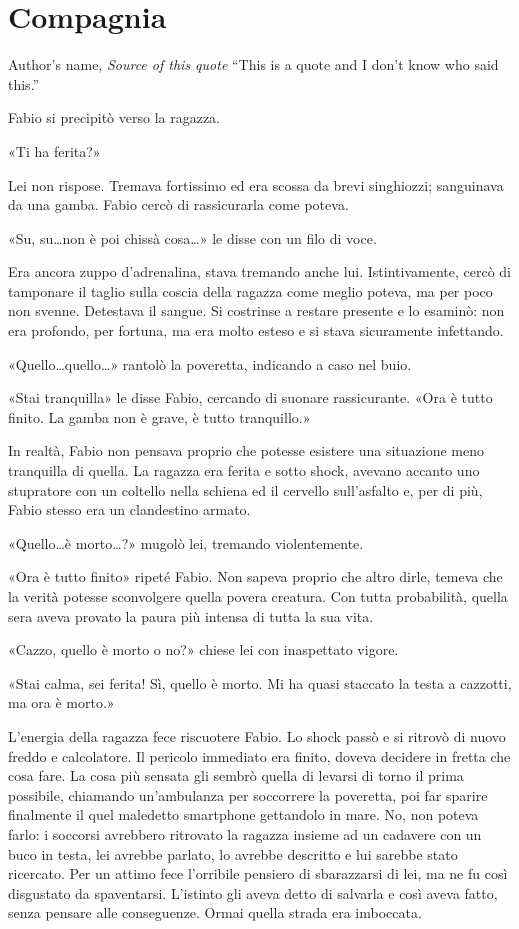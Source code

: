 \chapter{Compagnia}

\begin{chapquote}{Author's name, \textit{Source of this quote}}
``This is a quote and I don't know who said this.''
\end{chapquote}



Fabio si precipitò verso la ragazza.

«Ti ha ferita?»

Lei non rispose. Tremava fortissimo ed era scossa da brevi singhiozzi; sanguinava da una gamba. Fabio cercò di rassicurarla come poteva.

«Su, su\ldots non è poi chissà cosa\ldots» le disse con un filo di voce.

Era ancora zuppo d'adrenalina, stava tremando anche lui. Istintivamente, cercò di tamponare il taglio sulla coscia della ragazza come meglio poteva, ma per poco non svenne. Detestava il sangue. Si costrinse a restare presente e lo esaminò: non era profondo, per fortuna, ma era molto esteso e si stava sicuramente infettando.

«Quello\ldots quello\ldots» rantolò la poveretta, indicando a caso nel buio.

«Stai tranquilla» le disse Fabio, cercando di suonare rassicurante. «Ora è tutto finito. La gamba non è grave, è tutto tranquillo.»

In realtà, Fabio non pensava proprio che potesse esistere una situazione meno tranquilla di quella. La ragazza era ferita e sotto shock, avevano accanto uno stupratore con un coltello nella schiena ed il cervello sull'asfalto e, per di più, Fabio stesso era un clandestino armato.

«Quello\ldots è morto\ldots?» mugolò lei, tremando violentemente.

«Ora è tutto finito» ripeté Fabio. Non sapeva proprio che altro dirle, temeva che la verità potesse sconvolgere quella povera creatura. Con tutta probabilità, quella sera aveva provato la paura più intensa di tutta la sua vita.

«Cazzo, quello è morto o no?» chiese lei con inaspettato vigore.

«Stai calma, sei ferita! Sì, quello è morto. Mi ha quasi staccato la testa a cazzotti, ma ora è morto.»

L'energia della ragazza fece riscuotere Fabio. Lo shock passò e si ritrovò di nuovo freddo e calcolatore. Il pericolo immediato era finito, doveva decidere in fretta che cosa fare. La cosa più sensata gli sembrò quella di levarsi di torno il prima possibile, chiamando un'ambulanza per soccorrere la poveretta, poi far sparire finalmente il quel maledetto smartphone gettandolo in mare. No, non poteva farlo: i soccorsi avrebbero ritrovato la ragazza insieme ad un cadavere con un buco in testa, lei avrebbe parlato, lo avrebbe descritto e lui sarebbe stato ricercato. Per un attimo fece l'orribile pensiero di sbarazzarsi di lei, ma ne fu così disgustato da spaventarsi. L'istinto gli aveva detto di salvarla e così aveva fatto, senza pensare alle conseguenze. Ormai quella strada era imboccata.

